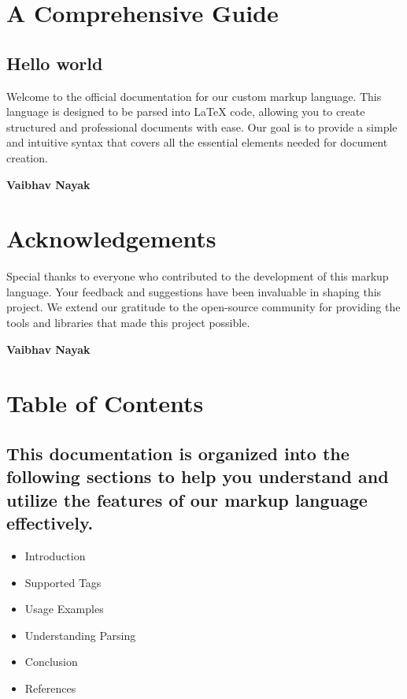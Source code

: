 \documentclass[oneside]{memoir}
\begin{document}
\setcounter{page}{0}
\tableofcontents

\clearpage
{}
\setcounter{page}{1}
\newpage
\chapter{A Comprehensive Guide}
\section{Hello world}
Welcome to the official documentation for our custom markup language. This language is designed to be parsed into LaTeX code, allowing you to create structured and professional documents with ease. Our goal is to provide a simple and intuitive syntax that covers all the essential elements needed for document creation.\par
\hfill \textbf{Vaibhav Nayak}
\date{2024-06-14}

\newpage
\chapter{Acknowledgements}
Special thanks to everyone who contributed to the development of this markup language. Your feedback and suggestions have been invaluable in shaping this project. We extend our gratitude to the open-source community for providing the tools and libraries that made this project possible.\par
\hfill \textbf{Vaibhav Nayak}
\date{2024-06-14}

\newpage
\chapter{Table of Contents}
\section{This documentation is organized into the following sections to help you understand and utilize the features of our markup language effectively.}
\begin{itemize}
\item Introduction
\item Supported Tags
\item Usage Examples
\item Understanding Parsing
\item Conclusion
\item References
\end{itemize}
\end{document}
